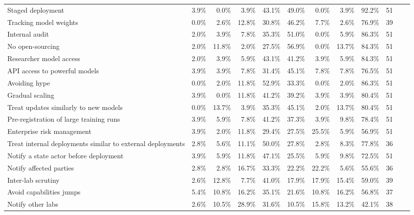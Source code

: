 \documentclass{article}
\begin{document}
\begin{sidewaystable}
\begin{tabular}{l *{11}{r}}
Staged deployment & 3.9\% & 0.0\% & 3.9\% & 43.1\% & 49.0\% & 0.0\% & 3.9\% & 92.2\% & 51 \\
Tracking model weights & 0.0\% & 2.6\% & 12.8\% & 30.8\% & 46.2\% & 7.7\% & 2.6\% & 76.9\% & 39 \\
Internal audit & 2.0\% & 3.9\% & 7.8\% & 35.3\% & 51.0\% & 0.0\% & 5.9\% & 86.3\% & 51 \\
No open-sourcing & 2.0\% & 11.8\% & 2.0\% & 27.5\% & 56.9\% & 0.0\% & 13.7\% & 84.3\% & 51 \\
Researcher model access & 2.0\% & 3.9\% & 5.9\% & 43.1\% & 41.2\% & 3.9\% & 5.9\% & 84.3\% & 51 \\
API access to powerful models & 3.9\% & 3.9\% & 7.8\% & 31.4\% & 45.1\% & 7.8\% & 7.8\% & 76.5\% & 51 \\
Avoiding hype & 0.0\% & 2.0\% & 11.8\% & 52.9\% & 33.3\% & 0.0\% & 2.0\% & 86.3\% & 51 \\
Gradual scaling & 3.9\% & 0.0\% & 11.8\% & 41.2\% & 39.2\% & 3.9\% & 3.9\% & 80.4\% & 51 \\
Treat updates similarly to new models & 0.0\% & 13.7\% & 3.9\% & 35.3\% & 45.1\% & 2.0\% & 13.7\% & 80.4\% & 51 \\
Pre-registration of large training runs & 3.9\% & 5.9\% & 7.8\% & 41.2\% & 37.3\% & 3.9\% & 9.8\% & 78.4\% & 51 \\
Enterprise risk management & 3.9\% & 2.0\% & 11.8\% & 29.4\% & 27.5\% & 25.5\% & 5.9\% & 56.9\% & 51 \\
Treat internal deployments similar to external deployments & 2.8\% & 5.6\% & 11.1\% & 50.0\% & 27.8\% & 2.8\% & 8.3\% & 77.8\% & 36 \\
Notify a state actor before deployment & 3.9\% & 5.9\% & 11.8\% & 47.1\% & 25.5\% & 5.9\% & 9.8\% & 72.5\% & 51 \\
Notify affected parties & 2.8\% & 2.8\% & 16.7\% & 33.3\% & 22.2\% & 22.2\% & 5.6\% & 55.6\% & 36 \\
Inter-lab scrutiny & 2.6\% & 12.8\% & 7.7\% & 41.0\% & 17.9\% & 17.9\% & 15.4\% & 59.0\% & 39 \\
Avoid capabilities jumps & 5.4\% & 10.8\% & 16.2\% & 35.1\% & 21.6\% & 10.8\% & 16.2\% & 56.8\% & 37 \\
Notify other labs & 2.6\% & 10.5\% & 28.9\% & 31.6\% & 10.5\% & 15.8\% & 13.2\% & 42.1\% & 38 \\
\bottomrule
\end{tabular}
\end{sidewaystable}
\end{document}
